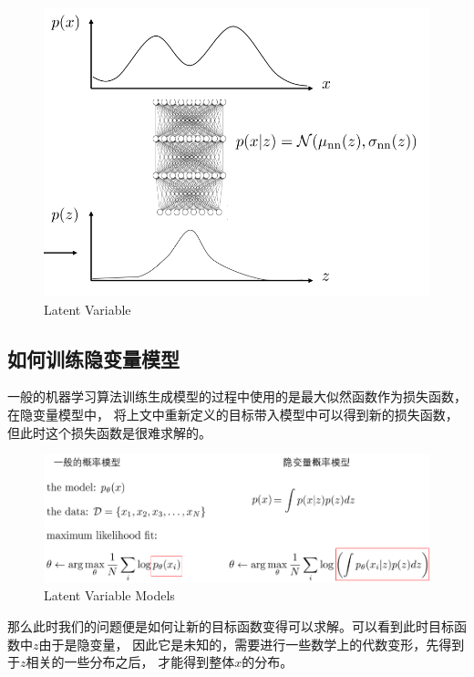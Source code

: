 \begin{figure}[!htb]
\centering
\includegraphics[scale=0.6]{pix/latent_variable.png}
\caption{Latent Variable}
\end{figure}


\subsection{如何训练隐变量模型}

一般的机器学习算法训练生成模型的过程中使用的是最大似然函数作为损失函数，在隐变量模型中，
将上文中重新定义的目标带入模型中可以得到新的损失函数，但此时这个损失函数是很难求解的。

\begin{figure}[!htb]
\centering
\includegraphics[scale=0.6]{pix/latent_variable_models.png}
\caption{Latent Variable Models}
\end{figure}

那么此时我们的问题便是如何让新的目标函数变得可以求解。可以看到此时目标函数中$z$由于是隐变量，
因此它是未知的，需要进行一些数学上的代数变形，先得到于$z$相关的一些分布之后，
才能得到整体$x$的分布。

